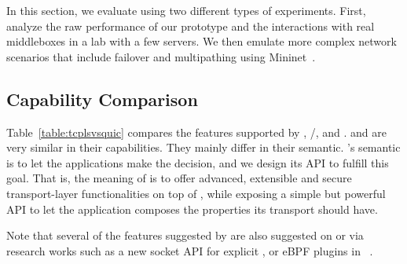 
In this section, we evaluate \tcpls using two different types of experiments. First, analyze the raw performance of our \tcpls prototype and the interactions with real middleboxes in a lab with a few servers. We then emulate more complex network scenarios that include failover and multipathing using Mininet~\cite{handigol2012reproducible}. 





\subsection{Capability Comparison}

Table~\ref{table:tcplsvsquic} compares the features supported by
\tcp, \tls/\tcp, \quic and \tcpls. \quic and \tcpls are very similar in their
capabilities. They mainly differ in their semantic. \tcpls's semantic is to let
the applications make the decision, and we design its API to fulfill this goal.
That is, the meaning of \tcpls is to offer advanced, extensible and secure
transport-layer functionalities on top of \tcp, while exposing a simple but
powerful API to let the application composes the properties its transport should
have.

Note that several of the features suggested by \tcpls are also suggested on \tcp or \quic via research works such as a new socket API for explicit \mptcp \cite{hesmans2016enhanced}, or eBPF plugins in
\quic~\cite{de2019pluginizing}.

